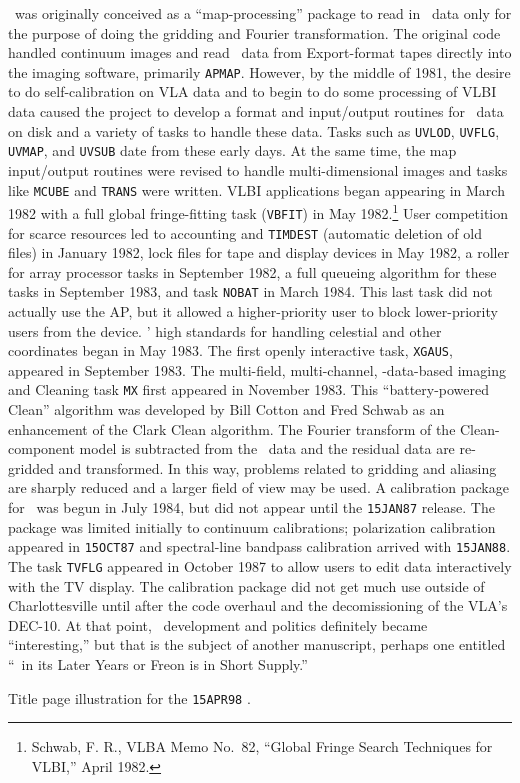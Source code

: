 \AIPS\ was originally conceived as a ``map-processing'' package to
read in \uv\ data only for the purpose of doing the gridding and
Fourier transformation.  The original code handled continuum images
and read \uv\ data from Export-format tapes directly into the imaging
software, primarily \hbox{{\tt APMAP}}.  However, by the middle of
1981, the desire to do self-calibration on VLA data and to begin to do
some processing of VLBI data caused the project to develop a format
and input/output routines for \uv\ data on disk and a variety of tasks
to handle these data.  Tasks such as {\tt UVLOD}, {\tt UVFLG}, {\tt
UVMAP}, and {\tt UVSUB} date from these early days.  At the same time,
the map input/output routines were revised to handle multi-dimensional
images and tasks like {\tt MCUBE} and {\tt TRANS} were written.  VLBI
applications began appearing in March 1982 with a full global
fringe-fitting task ({\tt VBFIT}) in May 1982.\footnote{Schwab, F. R.,
VLBA Memo No.~82, ``Global Fringe Search Techniques for VLBI,'' April
1982.}  User competition for scarce resources led to accounting and
{\tt TIMDEST} (automatic deletion of old files) in January 1982, lock
files for tape and display devices in May 1982, a roller for array
processor tasks in September 1982, a full queueing algorithm for these
tasks in September 1983, and task {\tt NOBAT} in March 1984.  This
last task did not actually use the AP, but it allowed a
higher-priority user to block lower-priority users from the device.
\AIPS' high standards for handling celestial and other coordinates
began in May 1983.  The first openly interactive task, {\tt XGAUS},
appeared in September 1983.  The multi-field, multi-channel,
\uv-data-based imaging and Cleaning task {\tt MX} first appeared in
November 1983.  This ``battery-powered Clean'' algorithm was developed
by Bill Cotton and Fred Schwab as an enhancement of the Clark Clean
algorithm.  The Fourier transform of the Clean-component model is
subtracted from the \uv\ data and the residual data are re-gridded and
transformed.  In this way, problems related to gridding and aliasing
are sharply reduced and a larger field of view may be used.  A
calibration package for \AIPS\ was begun in July 1984, but did not
appear until the {\tt 15JAN87} release.  The package was limited
initially to continuum calibrations; polarization calibration appeared
in {\tt 15OCT87} and spectral-line bandpass calibration arrived with
\hbox{{\tt 15JAN88}}.  The task {\tt TVFLG} appeared in October 1987 to
allow users to edit data interactively with the TV display.  The
calibration package did not get much use outside of Charlottesville
until after the code overhaul and the decomissioning of the VLA's
DEC-10.  At that point, \AIPS\ development and politics definitely
became ``interesting,'' but that is the subject of another manuscript,
perhaps one entitled  ``\AIPS\ in its Later Years or Freon is in Short
Supply.''

\vfill
\if\doFig\figyes
   \centerline{\hss{}\hss}
\else
   \vspace{3.5in}
   \fi
\vspace{15pt}
\centerline{\small {Title page illustration for the {\tt 15APR98}
   \Cookbook.}}
\vfill\eject

